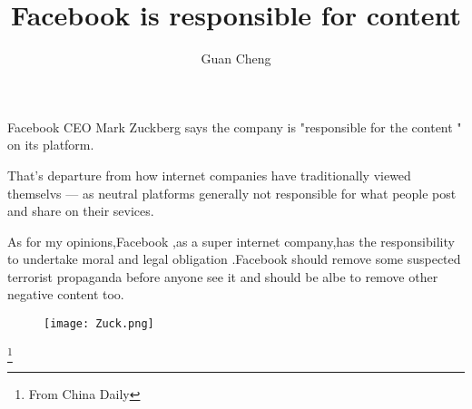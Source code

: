 \documentclass[UTF8]{article}
\author{Guan Cheng}
\title{Facebook is responsible for content}
\begin{document}
\maketitle
    Facebook CEO Mark Zuckberg says the company is "responsible for the
    content " on its platform.

    That's departure from how internet companies have traditionally
    viewed themselvs --- as neutral platforms generally not responsible
    for what people post and share on their sevices.

    As for my opinions,Facebook ,as a super internet company,has the responsibility
    to undertake moral and legal obligation .Facebook should remove some suspected
    terrorist propaganda before anyone see it and should be albe to remove other
    negative content too.

   \begin{figure}[h]
      \centering
      \texttt{[image: Zuck.png]}
    \end{figure}
  \footnote{\centering From China Daily}
\end{document}
